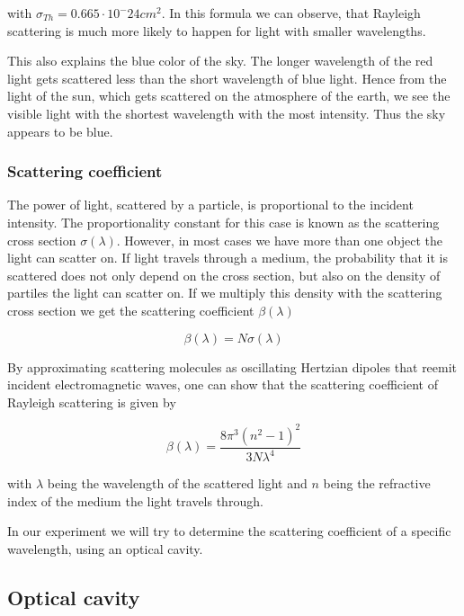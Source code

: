 \documentclass[12pt,a4paper]{article}
\begin{document}
with $\sigma_{Th} = 0.665 \cdot 10^-24 cm^2$. In this formula we can observe, that Rayleigh scattering is much more likely to happen for light with smaller wavelengths.

This also explains the blue color of the sky. The longer wavelength of the red light gets scattered less than the short wavelength of blue light. Hence from the light of the sun, which gets scattered on the atmosphere of the earth, we see the visible light with the shortest wavelength with the most intensity. Thus the sky appears to be blue.

\subsubsection{Scattering coefficient}

The power of light, scattered by a particle, is proportional to the incident intensity. The proportionality constant for this case is known as the scattering cross section $\sigma(\lambda)$. However, in most cases we have more than one object the light can scatter on. If light travels through a medium, the probability that it is scattered does not only depend on the cross section, but also on the density of partiles the light can scatter on. If we multiply this density with the scattering cross section we get the scattering coefficient $\beta(\lambda)$

\begin{equation}
\beta(\lambda) = N \sigma(\lambda)
\end{equation} 

By approximating scattering molecules as oscillating Hertzian dipoles that reemit incident electromagnetic waves, one can show that the scattering coefficient of Rayleigh scattering is given by

\begin{equation}
\beta(\lambda) =  \frac{8 \pi^3 (n^2-1)^2}{3N\lambda^4}
\end{equation}

with $\lambda$ being the wavelength of the scattered light and $n$ being the refractive index of the medium the light travels through.

In our experiment we will try to determine the scattering coefficient of a specific wavelength, using an optical cavity.

\subsection{Optical cavity}
\end{document}
